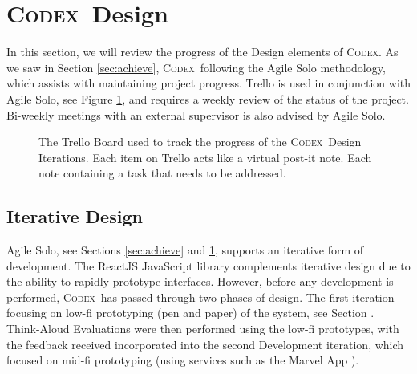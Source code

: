 \documentclass[progress]{cmpreport}
\newcommand{\Codex}{\textsc{Codex}}
\begin{document}
	\section{\Codex \ Design} \label{sec:design}
	In this section, we will review the progress of the Design elements of \Codex. As we saw in Section \ref{sec:achieve}, \Codex \ following the Agile Solo methodology, which assists with maintaining project progress. Trello is used in conjunction with Agile Solo, see Figure \ref{fig:trello-board}, and requires a weekly review of the status of the project. Bi-weekly meetings with an external supervisor is also advised by Agile Solo.  
	
	\begin{figure}[h]
		\centering
		\caption{The Trello Board used to track the progress of the \Codex \ Design Iterations. Each item on Trello acts like a virtual post-it note. Each note containing a task that needs to be addressed.} \label{fig:trello-board}
	\end{figure}
	
		\subsection{Iterative Design} \label{sec:iterative}
		Agile Solo, see Sections \ref{sec:achieve} and \ref{sec:design}, supports an iterative form of development. The ReactJS JavaScript library complements iterative design due to the ability to rapidly prototype interfaces. However, before any development is performed, \Codex \ has passed through two phases of design. The first iteration focusing on low-fi prototyping (pen and paper) of the system, see Section . Think-Aloud Evaluations were then performed using the low-fi prototypes, with the feedback received incorporated into the second Development iteration, which focused on mid-fi prototyping (using services such as the Marvel App \citep{marvelapp}).
	
\end{document}
